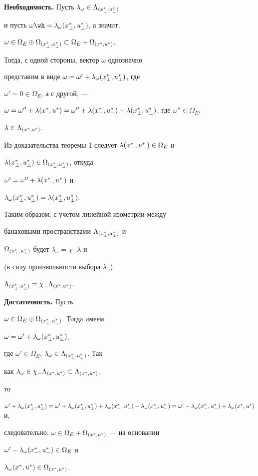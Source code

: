 \begin{pf} 


{\bf Необходимость.} Пусть $\lambda_\omega\in\Lambda_{{(x^*_{\bot},u^*_{\bot})}}$ 


и пусть $\omega\wh =\lambda_\omega\myxu{\bot}$, а значит,


$\omega\in\Omega_E\oplus\Omega_{\myxu{\bot}}\subset 


\Omega_E+\Omega_{\myxu{}}$. 


Тогда, с одной стороны, вектор $\omega$ однозначно 


представим в виде $\omega=\omega'+\lambda_\omega{(x^*_{\bot},u^*_{\bot})}$, где 


$\omega'=0\in\Omega_E$, а с другой, --- 


$\omega=\omega''+\lambda\myxu{}=\omega''+\lambda\myxu{-}+ 


\lambda\myxu{\bot}$, где $\omega''\in\Omega_E$, 


$\lambda\in\Lambda_{{(x^*_{},u^*_{})}}$. 


Из доказательства теоремы 1 следует $\lambda{(x^*_{-},u^*_{-})}\in\Omega_E$ и 


$\lambda{(x^*_{\bot},u^*_{\bot})}\in\Omega_{{(x^*_{\bot},u^*_{\bot})}}$, откуда 


$\omega'=\omega''+\lambda{(x^*_{-},u^*_{-})}$ и 


$\lambda_\omega{(x^*_{\bot},u^*_{\bot})}=\lambda{(x^*_{\bot},u^*_{\bot})}$. 


Таким образом, с учетом линейной изометрии между 


банаховыми пространствами $\Lambda_{{(x^*_{\bot},u^*_{\bot})}}$ и 


$\Omega_{{(x^*_{\bot},u^*_{\bot})}}$ будет $\lambda_\omega=\chi_-\lambda$ и 


(в силу произвольности выбора $\lambda_\omega$) 


$\Lambda_{{(x^*_{\bot},u^*_{\bot})}}=\chi_-\Lambda_{{(x^*_{},u^*_{})}}$. 


 


{\bf Достаточность.} Пусть 


$\omega\in\Omega_E\oplus\Omega_{{(x^*_{\bot},u^*_{\bot})}}$. Тогда имеем 


$\omega=\omega'+\lambda_\omega{(x^*_{\bot},u^*_{\bot})}$, 


где $\omega'\in\Omega_E$, $\lambda_\omega\in\Lambda_{{(x^*_{\bot},u^*_{\bot})}}$. Так 


как $\lambda_\omega\in\chi_-\Lambda_{{(x^*_{},u^*_{})}}\subset\Lambda_{{(x^*_{},u^*_{})}}$, 


то 


$\omega'+\lambda_\omega\myxu{\bot}=\omega'+\lambda_\omega\myxu{\bot}+ 


\lambda_\omega\myxu{-}-\lambda_\omega\myxu{-}= 


\omega'-\lambda_\omega\myxu{-}+\lambda_\omega\myxu{}$ и, 


следовательно, $\omega\in\Omega_E+\Omega_{{(x^*_{},u^*_{})}}$ --- на основании 


$\omega'-\lambda_\omega{(x^*_{-},u^*_{-})}\in\Omega_E$ и 


$\lambda_\omega{(x^*_{},u^*_{})}\in\Omega_{{(x^*_{},u^*_{})}}$. 


\end{pf} 


